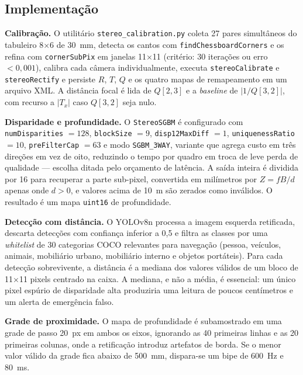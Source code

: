 \documentclass[12pt]{article}
\begin{document}
\subsection{Implementação}

\textbf{Calibração.} O utilitário \texttt{stereo\_calibration.py} coleta 27
pares simultâneos do tabuleiro 8$\times$6 de 30~mm, detecta os cantos com
\texttt{findChessboardCorners} e os refina com \texttt{cornerSubPix} em
janelas 11$\times$11 (critério: 30 iterações ou erro $< 0{,}001$), calibra
cada câmera individualmente, executa \texttt{stereoCalibrate} e
\texttt{stereoRectify} e persiste $R$, $T$, $Q$ e os quatro mapas de
remapeamento em um arquivo XML. A distância focal é lida de $Q[2,3]$ e a
\textit{baseline} de $|1/Q[3,2]|$, com recurso a $|T_x|$ caso $Q[3,2]$ seja
nulo.

\textbf{Disparidade e profundidade.} O \texttt{StereoSGBM} é configurado com
\texttt{numDisparities} $= 128$, \texttt{blockSize} $= 9$,
\texttt{disp12MaxDiff} $= 1$, \texttt{uniquenessRatio} $= 10$,
\texttt{preFilterCap} $= 63$ e modo \texttt{SGBM\_3WAY}, variante que agrega
custo em três direções em vez de oito, reduzindo o tempo por quadro em troca
de leve perda de qualidade --- escolha ditada pelo orçamento de latência. A
saída inteira é dividida por 16 para recuperar a parte sub-pixel, convertida
em milímetros por $Z = fB/d$ apenas onde $d > 0$, e valores acima de 10~m são
zerados como inválidos. O resultado é um mapa \texttt{uint16} de profundidade.

\textbf{Detecção com distância.} O YOLOv8n processa a imagem esquerda
retificada, descarta detecções com confiança inferior a 0,5 e filtra as
classes por uma \textit{whitelist} de 30 categorias COCO relevantes para
navegação (pessoa, veículos, animais, mobiliário urbano, mobiliário interno e
objetos portáteis). Para cada detecção sobrevivente, a distância é a mediana
dos valores válidos de um bloco de 11$\times$11 pixels centrado na caixa. A
mediana, e não a média, é essencial: um único pixel espúrio de disparidade
alta produziria uma leitura de poucos centímetros e um alerta de emergência
falso.

\textbf{Grade de proximidade.} O mapa de profundidade é subamostrado em uma
grade de passo 20~px em ambos os eixos, ignorando as 40 primeiras linhas e as
20 primeiras colunas, onde a retificação introduz artefatos de borda. Se o
menor valor válido da grade fica abaixo de 500~mm, dispara-se um bipe de
600~Hz e 80~ms.
\end{document}
